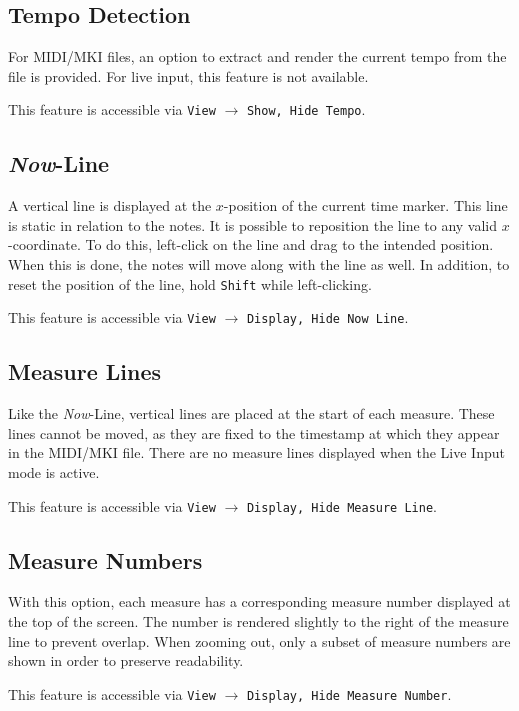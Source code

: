\documentclass[english]{article}
\providecommand{\mi}[1]{\texttt{#1}}
\begin{document}
\subsection{Tempo Detection}

For MIDI/MKI files, an option to extract and render the current tempo from the file is provided. For live input,
this feature is not available.

This feature is accessible via 
\mi{View} $\rightarrow$ \mi{{Show, Hide} Tempo}.

\subsection{\textit{Now}-Line}

A vertical line is displayed at the $x$-position of the current time marker. This line is static in relation to the notes.
It is possible to reposition the line to any valid $x$-coordinate. To do this, left-click on the line and drag to the 
intended position. When this is done, the notes will move along with the line as well. In addition, to reset the position of
the line, hold \mi{Shift} while left-clicking.

This feature is accessible via 
\mi{View} $\rightarrow$ \mi{{Display, Hide} Now Line}.

\subsection{Measure Lines}

Like the \textit{Now}-Line, vertical lines are placed at the start of each measure. These lines cannot be moved, as 
they are fixed to the timestamp at which they appear in the MIDI/MKI file.
There are no measure lines displayed when the Live Input mode is active.

This feature is accessible via 
\mi{View} $\rightarrow$ \mi{{Display, Hide} Measure Line}.

\subsection{Measure Numbers}

With this option, each measure has a corresponding measure number displayed at the top of the screen. The number is rendered
slightly to the right of the measure line to prevent overlap. When zooming out, only a subset of measure numbers are shown in
order to preserve readability.

This feature is accessible via 
\mi{View} $\rightarrow$ \mi{{Display, Hide} Measure Number}.
\end{document}
